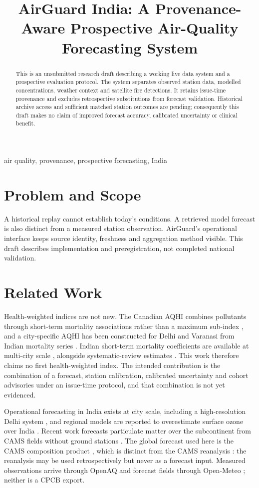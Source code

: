 \documentclass[conference]{IEEEtran}
\title{AirGuard India: A Provenance-Aware Prospective Air-Quality Forecasting System}
\author{\IEEEauthorblockN{Nishanth R, NAME, NAME}
\IEEEauthorblockA{Affiliations and author consent pending human confirmation}}
\begin{document}
\maketitle
\begin{abstract}
This is an unsubmitted research draft describing a working live data system and
a prospective evaluation protocol. The system separates observed station data,
modelled concentrations, weather context and satellite fire detections. It
retains issue-time provenance and excludes retrospective substitutions from
forecast validation. Historical archive access and sufficient matched station
outcomes are pending; consequently this draft makes no claim of improved
forecast accuracy, calibrated uncertainty or clinical benefit.
\end{abstract}
\begin{IEEEkeywords}air quality, provenance, prospective forecasting, India\end{IEEEkeywords}
\section{Problem and Scope}
A historical replay cannot establish today's conditions. A retrieved model
forecast is also distinct from a measured station observation. AirGuard's
operational interface keeps source identity, freshness and aggregation method
visible. This draft describes implementation and preregistration, not completed
national validation.
\section{Related Work}
Health-weighted indices are not new. The Canadian AQHI combines pollutants
through short-term mortality associations rather than a maximum sub-index
\cite{stieb2008aqhi}, and a city-specific AQHI has been constructed for Delhi and
Varanasi from Indian mortality series \cite{george2025aqhi}. Indian short-term
mortality coefficients are available at multi-city scale \cite{debont2024india},
alongside systematic-review estimates \cite{orellano2020shortterm}. This work
therefore claims no first health-weighted index. The intended contribution is the
combination of a forecast, station calibration, calibrated uncertainty and cohort
advisories under an issue-time protocol, and that combination is not yet
evidenced.

Operational forecasting in India exists at city scale, including a
high-resolution Delhi system \cite{jena2021delhi}, and regional models are
reported to overestimate surface ozone over India \cite{pommier2018india}. Recent
work forecasts particulate matter over the subcontinent from CAMS fields without
ground stations \cite{kushwaha2025nowcasting}. The global forecast used here is
the CAMS composition product \cite{cams2024forecasts}, which is distinct from the
CAMS reanalysis \cite{inness2019camsra}: the reanalysis may be used
retrospectively but never as a forecast input. Measured observations arrive
through OpenAQ \cite{openaq2026} and forecast fields through Open-Meteo
\cite{openmeteo2026}; neither is a CPCB export.
\end{document}
